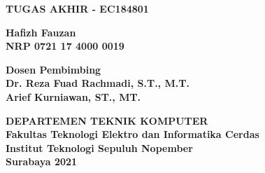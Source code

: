 \begin{flushleft}

  \sffamily\color{white}

  \noindent\textbf{TUGAS AKHIR - EC184801}
  \vspace{6ex}

  \vspace{4ex}

  \noindent\textbf{Hafizh Fauzan} \\
  \textbf{NRP 0721 17 4000 0019}
  \vspace{2ex}

  \noindent\textbf{Dosen Pembimbing} \\
  \textbf{Dr. Reza Fuad Rachmadi, S.T., M.T.} \\
  \textbf{Arief Kurniawan, ST., MT.}
  \vspace{6ex}

  \noindent\textbf{DEPARTEMEN TEKNIK KOMPUTER} \\
  \textbf{Fakultas Teknologi Elektro dan Informatika Cerdas} \\
  \textbf{Institut Teknologi Sepuluh Nopember} \\
  \textbf{Surabaya 2021}

\end{flushleft}

\restoregeometry